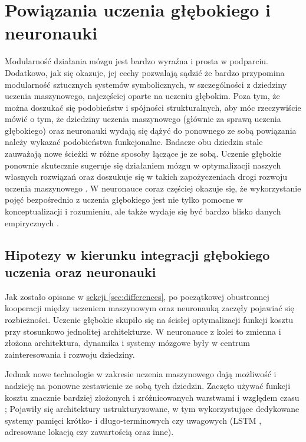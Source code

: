 \chapter{Powiązania uczenia głębokiego i neuronauki}

Modularność działania mózgu jest bardzo wyraźna i prosta w podparciu.
Dodatkowo, jak się okazuje, jej cechy pozwalają sądzić że bardzo przypomina modularność sztucznych systemów symbolicznych, w szczególności z dziedziny uczenia maszynowego, najczęściej oparte na uczeniu głębokim.
Poza tym, że można doszukać się podobieństw i spójności strukturalnych, aby móc rzeczywiście mówić o tym, że dziedziny uczenia maszynowego (głównie za sprawą uczenia głębokiego) oraz neuronauki wydają się dążyć do ponownego ze sobą powiązania należy wykazać podobieństwa funkcjonalne.
Badacze obu dziedzin stale zauważają nowe ścieżki w różne sposoby łączące je ze sobą.
Uczenie głębokie ponownie skutecznie sugeruje się działaniem mózgu w optymalizacji naszych własnych rozwiązań oraz doszukuje się w takich zapożyczeniach drogi rozwoju uczenia maszynowego \cite{lake2017building}.
W neuronauce coraz częściej okazuje się, że wykorzystanie pojęć bezpośrednio z uczenia głębokiego jest nie tylko pomocne w konceptualizacji i rozumieniu, ale także wydaje się być bardzo blisko danych empirycznych \cite{dayan2001theoretical, doya1999computations}.

\section{Hipotezy w kierunku integracji głębokiego uczenia oraz neuronauki}

Jak zostało opisane w \hyperref[sec:differences]{sekcji \ref*{sec:differences}}, po początkowej obustronnej kooperacji między uczeniem maszynowym oraz neuronauką zaczęły pojawiać się rozbieżności.
Uczenie głębokie skupiło się na ścisłej optymalizacji funkcji kosztu przy stosunkowo jednolitej architekturze.
W neuronauce z kolei to zmienna i złożona architektura, dynamika i systemy mózgowe były w centrum zainteresowania i rozwoju dziedziny.

Jednak nowe technologie w zakresie uczenia maszynowego dają możliwość i nadzieję na ponowne zestawienie ze sobą tych dziedzin.
Zaczęto używać funkcji kosztu znacznie bardziej złożonych i zróżnicowanych warstwami i względem czasu \cite{gulccehre2016knowledge, saxe2013exact};
Pojawiły się architektury ustrukturyzowane, w tym wykorzystujące dedykowane systemy pamięci krótko- i długo-terminowych czy uwagowych (LSTM \cite{chung2014empirical}, adresowane lokacją czy zawartością \cite{graves2014neural} oraz inne).


